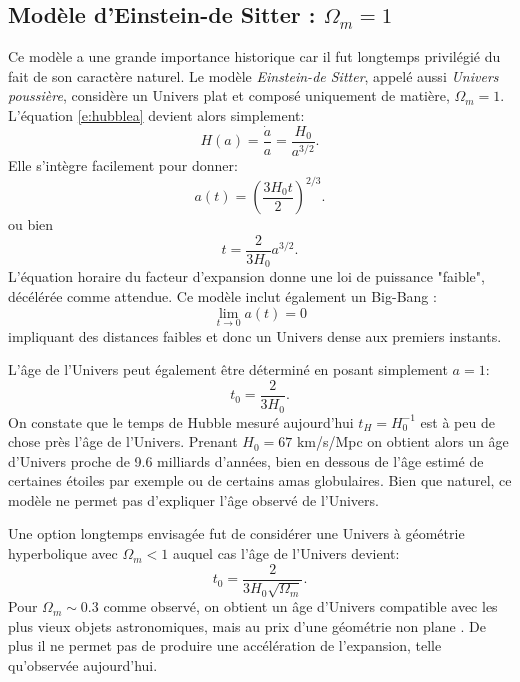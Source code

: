 \subsection{Modèle d'Einstein-de Sitter : $\Omega_m=1$}
Ce modèle a une grande importance historique car il fut longtemps privilégié du fait de son caractère naturel. Le modèle \textit{Einstein-de Sitter}, appelé aussi \textit{Univers poussière}, considère un Univers plat et composé uniquement de matière, $\Omega_m=1$.  L'équation \ref{e:hubblea} devient alors simplement:
\begin{equation}
H(a)=\frac{\dot a}{a}=\frac{H_0}{a^{3/2 }}.
\end{equation}
Elle s'intègre facilement pour donner:
\begin{equation}
a(t)=\left(\frac{3H_0t}{2}\right)^{2/3}.
\end{equation}
ou bien
\begin{equation}
t=\frac{2}{3H_0}a^{3/2}.
\end{equation}
L'équation horaire du facteur d'expansion donne une loi de puissance "faible", décélérée comme attendue. Ce modèle inclut également un Big-Bang :
\begin{equation}
\lim_{t \to 0} a(t)=0
\end{equation}
impliquant des distances faibles et donc un Univers dense aux premiers instants.

L'âge de l'Univers peut également être déterminé en posant simplement $a=1$:
\begin{equation}
t_0=\frac{2}{3H_0}.
\end{equation}
On constate que le temps de Hubble mesuré aujourd'hui $t_H=H_0^{-1}$ est à peu de chose près l'âge de l'Univers. Prenant $H_0=67$ km/s/Mpc on obtient alors un âge d'Univers proche de 9.6 milliards d'années, bien en dessous de l'âge estimé de certaines étoiles par exemple ou de certains amas globulaires.  Bien que naturel, ce modèle ne permet pas d'expliquer l'âge observé de l'Univers. 

Une option longtemps envisagée fut de considérer une Univers à géométrie hyperbolique avec $\Omega_m<1$ auquel cas l'âge de l'Univers devient:
\begin{equation}
t_0=\frac{2}{3H_0\sqrt{\Omega_m}}.
\end{equation}
Pour $\Omega_m\sim0.3$ comme observé, on obtient un âge d'Univers compatible avec les plus vieux objets astronomiques, mais au prix d'une géométrie non plane . De plus il ne permet pas de produire une accélération de l'expansion, telle qu'observée aujourd'hui.

